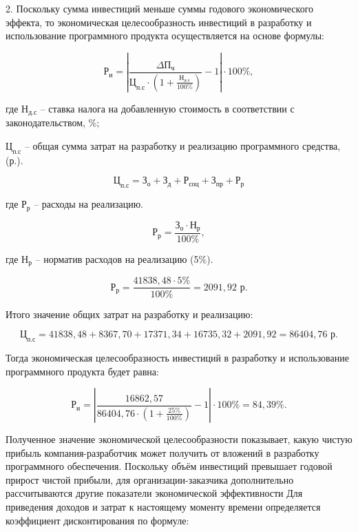 2. Поскольку сумма инвестиций меньше суммы годового экономического эффекта, то экономическая целесообразность инвестиций в разработку и использование программного продукта осуществляется на основе формулы:

\begin{equation}
	\text{Р}_{\text{и}} = |\frac{\text{$\Delta$П}_{\text{ч}}}{\text{Ц}_{\text{п.с}} \cdot (1 + \frac{\text{Н}_{\text{д.с}}}{100\%})} - 1| \cdot 100\%,
\end{equation}

где $\text{Н}_{\text{д.с}}$ -- ставка налога на добавленную стоимость в соответствии с законодательством, {\%};

$\text{Ц}_{\text{п.с}}$ -- общая сумма затрат на разработку и реализацию программного средства, (р.).

$$
	\text{Ц}_{\text{п.с}} =\text{З}_{\text{о}} + \text{З}_{\text{д}} + \text{Р}_{\text{соц}} + \text{З}_{\text{пр}} + \text{Р}_{\text{р}}
$$

где $\text{Р}_{\text{р}}$ -- расходы на реализацию.

\begin{equation}
	\text{Р}_{\text{р}} = \frac{\text{З}_{\text{о}} \cdot \text{Н}_{\text{р}}}{100\%},
\end{equation}

где $\text{Н}_{\text{р}}$ -- норматив расходов на реализацию (5\%).

\begin{equation}
	\text{Р}_{\text{р}} = \frac{41838,48 \cdot 5\%}{100\%} = 2091,92 \text{ р}.
\end{equation}

Итого значение общих затрат на разработку и реализацию:

$$
	\text{Ц}_{\text{п.с}} = 41838,48+8367,70+17371,34+16735,32+2091,92 = 86404,76 \text{ р}.
$$


Тогда экономическая целесообразность инвестиций в разработку и использование программного продукта будет равна:

\begin{equation}
	\text{Р}_{\text{и}} = |\frac{16862,57 }{86404,76 \cdot (1 + \frac{25\%}{100\%})} - 1| \cdot 100\% = 84, 39 \%.
\end{equation}

Полученное значение экономической целесообразности показывает, какую чистую прибыль компания-разработчик может получить от вложений в разработку программного
обеспечения. Поскольку объём инвестиций превышает годовой прирост чистой прибыли, для организации-заказчика дополнительно рассчитываются
другие показатели экономической эффективности
Для приведения доходов и затрат к настоящему моменту времени
определяется коэффициент дисконтирования по формуле:

